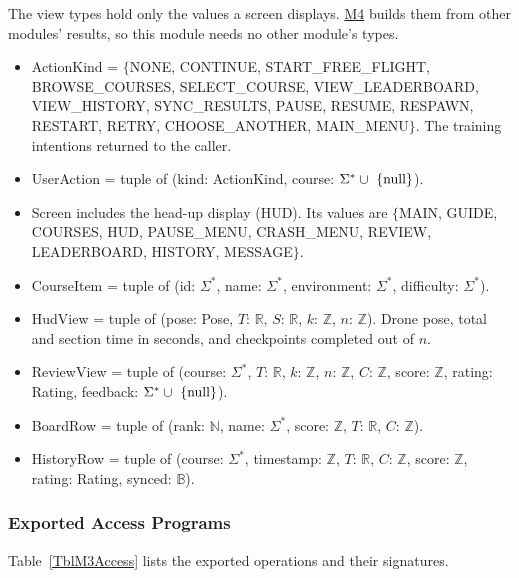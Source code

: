 \documentclass[12pt, titlepage]{article}
\newcommand{\nul}{\textnormal{null}}
\newcommand{\Mref}[1]{\hyperref[sec:M#1]{M#1}}
\begin{document}
The view types hold only the values a screen displays. \Mref{4} builds them
from other modules' results, so this module needs no other module's types.

\begin{itemize}
\item ActionKind = $\{$NONE, CONTINUE, START\_FREE\_FLIGHT, BROWSE\_COURSES,
  SELECT\_COURSE, VIEW\_LEADERBOARD, VIEW\_HISTORY, SYNC\_RESULTS, PAUSE,
  RESUME, RESPAWN, RESTART, RETRY, CHOOSE\_ANOTHER, MAIN\_MENU$\}$. The
  training intentions returned to the caller.
\item UserAction = tuple of (kind: ActionKind, course: $\Sigma^* \cup
  \ \{\nul\}$).
\item Screen includes the head-up display (HUD). Its values are
  $\{$MAIN, GUIDE, COURSES, HUD, PAUSE\_MENU, CRASH\_MENU, REVIEW,
  LEADERBOARD, HISTORY, MESSAGE$\}$.
\item CourseItem = tuple of (id: $\Sigma^*$, name: $\Sigma^*$, environment:
  $\Sigma^*$, difficulty: $\Sigma^*$).
\item HudView = tuple of (pose: Pose, $T$: $\mathbb{R}$, $S$: $\mathbb{R}$,
  $k$: $\mathbb{Z}$, $n$: $\mathbb{Z}$). Drone pose, total and section time in
  seconds, and checkpoints completed out of $n$.
\item ReviewView = tuple of (course: $\Sigma^*$, $T$: $\mathbb{R}$, $k$:
  $\mathbb{Z}$, $n$: $\mathbb{Z}$, $C$: $\mathbb{Z}$, score: $\mathbb{Z}$,
  rating: Rating, feedback: $\Sigma^* \cup \ \{\nul\}$).
\item BoardRow = tuple of (rank: $\mathbb{N}$, name: $\Sigma^*$, score:
  $\mathbb{Z}$, $T$: $\mathbb{R}$, $C$: $\mathbb{Z}$).
\item HistoryRow = tuple of (course: $\Sigma^*$, timestamp: $\mathbb{Z}$, $T$:
  $\mathbb{R}$, $C$: $\mathbb{Z}$, score: $\mathbb{Z}$, rating: Rating,
  synced: $\mathbb{B}$).
\end{itemize}

\subsubsection{Exported Access Programs}

Table~\ref{TblM3Access} lists the exported operations and their signatures.
\end{document}

